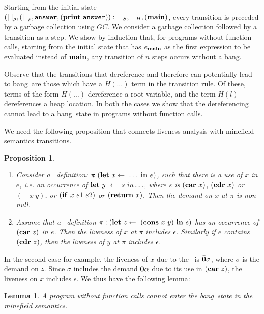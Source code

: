 \documentclass[9pt]{sigplanconf}
\newcommand{\bang}{\mbox{\sc bang}}
\newtheorem{proposition}[theorem]{Proposition}
\newtheorem{lemma}[theorem]{Lemma}
\begin{document}
Starting   from  the   initial  state   $([\;]_\rho,([\;]_\rho,  \mathbf{\mbox{\tt answer}},
(\mathbf{print}~\mathbf{\mbox{\tt answer}})):[\;]_{S} ,  [\;]_{H}, (\mathbf{main})$, every  transition is
preceded by  a garbage collection  using $GC$.  We consider  a garbage
collection followed  by a transition as  a step. We show  by induction
that, for programs  without function calls, starting  from the initial
state that  has $e_{\mathbf{main}}$  as the first  expression to  be evaluated
instead  of $\mathbf{main}$,  any transition  of  $n$ steps  occurs without  a
\bang.

Observe  that  the  transitions  that dereference  and  therefore  can
potentially lead to \bang\ are those  which have a $H(\ldots)$ term in
the  transition  rule.   Of  these,  terms  of  the  form  $H(\ldots)$
dereference a root  variable, and the term $H(l)$  dereferences a heap
location.  In  both the  cases we show  that the  dereferencing cannot
lead to a \bang\ state in programs without function calls.

We  need the  following proposition that  connects  liveness analysis  with
minefield semantics transitions. 
\begin{proposition}
\label{prop:correctness}
\begin{enumerate} 
\item   Consider  a   \LET\  definition:   \linebreak  $\pi\!\!\!:   (\mbox{$\mathbf{ let}$}~x
  \leftarrow~\ldots~\mbox{$\mathbf{ in}$}~e)$, such  that there is  a use of $x$  in $e$,
  i.e.  an occurrence of $\mbox{$\mathbf{ let}$}~y~\leftarrow~s~in \ldots$, where $s$ is
  $(\mbox{$\mathbf{car}$}\ x)$, $(\mbox{$\mathbf{cdr}$}\ x)$  or $(+\ x\ y)$, or $(\mbox{$\mathbf{ if}$}\  x\ e1\ e2)$ or
  $(\mbox{$\mathbf{ return}$}\ x)$. Then the demand on $x$ at $\pi$ is non-null.
\item    Assume    that    a   \LET\    definition    $\pi:    (\mbox{$\mathbf{ let}$}~z
  \leftarrow~(\mbox{$\mathbf{cons}$}~x~y)~\mbox{$\mathbf{ in}$}~e)$  has an  occurrence  of $(\mbox{$\mathbf{car}$}~z)$  in
  $e$.  Then  the  liveness  of  $x$  at  $\pi$  includes  $\epsilon$.
  Similarly  if $e$  contains $(\mbox{$\mathbf{cdr}$}~z)$,  then the  liveness of $y$  at
  $\pi$ includes $\epsilon$.
\end{enumerate}
\end{proposition} 

In  the second  case for  example,  the liveness  of $x$  due to  the
\CONS\ is  $\bar{\mathbf{0}}\sigma$, where $\sigma$  is the demand on  $z$. Since
$\sigma$  includes  the  demand  $\mathbf{0}\alpha$   due  to  its  use  in
$(\mbox{$\mathbf{car}$}~z)$, the liveness on $x$  includes $\epsilon$. We thus have the
following lemma:

\begin{lemma}\label{lemma:no-calls-correctness} 
A program without function calls cannot  enter the \bang\ state in the
minefield semantics.
\end{lemma}
\end{document}
